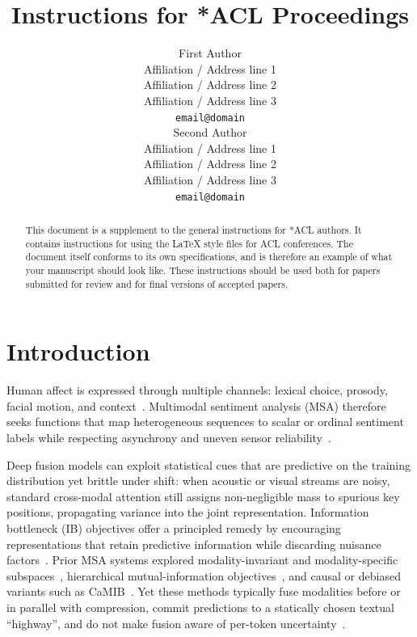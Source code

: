 \documentclass[11pt]{article}
\title{Instructions for *ACL Proceedings}
\author{First Author \\
  Affiliation / Address line 1 \\
  Affiliation / Address line 2 \\
  Affiliation / Address line 3 \\
  \texttt{email@domain} \\\And
  Second Author \\
  Affiliation / Address line 1 \\
  Affiliation / Address line 2 \\
  Affiliation / Address line 3 \\
  \texttt{email@domain} \\}
\begin{document}
\maketitle
\begin{abstract}
This document is a supplement to the general instructions for *ACL authors. It contains instructions for using the \LaTeX{} style files for ACL conferences.
The document itself conforms to its own specifications, and is therefore an example of what your manuscript should look like.
These instructions should be used both for papers submitted for review and for final versions of accepted papers.
\end{abstract}

\section{Introduction}
\label{sec:intro}

Human affect is expressed through multiple channels: lexical choice, prosody,
facial motion, and context~\citep{zadeh2017tensor,zadeh2018multi}.
Multimodal sentiment analysis (MSA) therefore seeks functions that map
heterogeneous sequences to scalar or ordinal sentiment labels while respecting
asynchrony and uneven sensor reliability~\citep{tsai2019multimodal}.

Deep fusion models can exploit statistical cues that are predictive on the
training distribution yet brittle under shift: when acoustic or visual streams
are noisy, standard cross-modal attention still assigns non-negligible mass to
spurious key positions, propagating variance into the joint representation.
Information bottleneck (IB) objectives offer a principled remedy by encouraging
representations that retain predictive information while discarding nuisance
factors~\citep{alemi2017deep}.
Prior MSA systems explored modality-invariant and modality-specific
subspaces~\citep{hazarika2020misa,yu2021learning}, hierarchical mutual-information
objectives~\citep{han2021improving}, and causal or debiased variants such as
CaMIB~\citep{jiang2025towards}.
Yet these methods typically fuse modalities before or in parallel with
compression, commit predictions to a statically chosen textual ``highway'', and
do not make fusion aware of per-token uncertainty~\citep{yang2025improving}.
\end{document}
